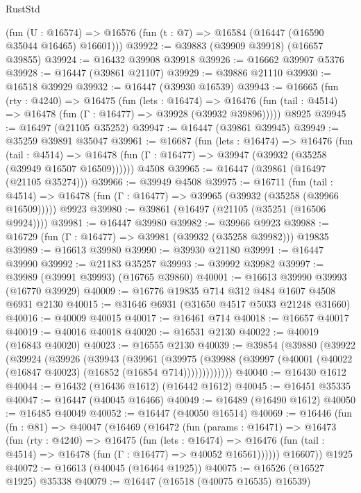 \begin{lexlean}{RustStd}
\begin{coremodule}
    (fun (U : @16574) => @16576 (fun (t : @7) => @16584 (@16447 (@16590 @35044 @16465) @16601)))
@39922 := @39883 (@39909 @39918) (@16657 @39855)
@39924 := @16432 @39908 @39918
@39926 := @16662 @39907 @5376
@39928 := @16447 (@39861 @21107)
@39929 := @39886 @21110
@39930 := @16518 @39929
@39932 := @16447 (@39930 @16539)
@39943 := @16665
    (fun (rty : @4240) =>
    @16475
      (fun (lets : @16474) =>
      @16476 (fun (tail : @4514) => @16478 (fun (Γ : @16477) => @39928 (@39932 @39896)))))
    @8925
@39945 := @16497 (@21105 @35252)
@39947 := @16447 (@39861 @39945)
@39949 := @35259 @39891 @35047
@39961 := @16687
    (fun (lets : @16474) =>
    @16476
      (fun (tail : @4514) =>
      @16478 (fun (Γ : @16477) => @39947 (@39932 (@35258 (@39949 @16507 @16509))))))
    @4508
@39965 := @16447 (@39861 (@16497 (@21105 @35274)))
@39966 := @39949 @4508
@39975 := @16711
    (fun (tail : @4514) => @16478 (fun (Γ : @16477) => @39965 (@39932 (@35258 (@39966 @16509)))))
    @9923
@39980 := @39861 (@16497 (@21105 (@35251 (@16506 @9924))))
@39981 := @16447 @39980
@39982 := @39966 @9923
@39988 := @16729 (fun (Γ : @16477) => @39981 (@39932 (@35258 @39982))) @19835
@39989 := @16613 @39980
@39990 := @39930 @21180
@39991 := @16447 @39990
@39992 := @21183 @35257
@39993 := @39992 @39982
@39997 := @39989 (@39991 @39993) (@16765 @39860)
@40001 := @16613 @39990 @39993 (@16770 @39929)
@40009 := @16776 @19835 @714 @312 @484 @1607 @4508 @6931 @2130
@40015 := @31646 @6931 (@31650 @4517 @5033 @21248 @31660)
@40016 := @40009 @40015
@40017 := @16461 @714
@40018 := @16657 @40017
@40019 := @40016 @40018
@40020 := @16531 @2130
@40022 := @40019 (@16843 @40020)
@40023 := @16555 @2130
@40039 := @39854
    (@39880
      (@39922
        (@39924
          (@39926
            (@39943
              (@39961
                (@39975
                  (@39988 (@39997 (@40001 (@40022 (@16847 @40023) (@16852 (@16854 @714)))))))))))))
@40040 := @16430 @1612
@40044 := @16432 (@16436 @1612) (@16442 @1612)
@40045 := @16451 @35335
@40047 := @16447 (@40045 @16466)
@40049 := @16489 (@16490 @1612)
@40050 := @16485 @40049
@40052 := @16447 (@40050 @16514)
@40069 := @16446
    (fun (fn : @81) =>
    @40047
      (@16469
        (@16472
          (fun (params : @16471) =>
          @16473
            (fun (rty : @4240) =>
            @16475
              (fun (lets : @16474) =>
              @16476 (fun (tail : @4514) => @16478 (fun (Γ : @16477) => @40052 @16561))))))
        @16607))
    @1925
@40072 := @16613 (@40045 (@16464 @1925))
@40075 := @16526 (@16527 @1925) @35338
@40079 := @16447 (@16518 (@40075 @16535) @16539)

\end{coremodule}
\end{lexlean}
